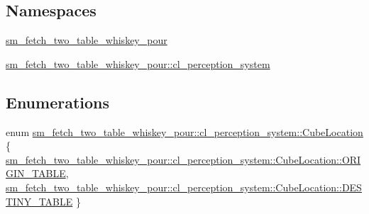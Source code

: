 \subsection*{Namespaces}
\begin{DoxyCompactItemize}
\item 
 \hyperlink{namespacesm__fetch__two__table__whiskey__pour}{sm\+\_\+fetch\+\_\+two\+\_\+table\+\_\+whiskey\+\_\+pour}
\item 
 \hyperlink{namespacesm__fetch__two__table__whiskey__pour_1_1cl__perception__system}{sm\+\_\+fetch\+\_\+two\+\_\+table\+\_\+whiskey\+\_\+pour\+::cl\+\_\+perception\+\_\+system}
\end{DoxyCompactItemize}
\subsection*{Enumerations}
\begin{DoxyCompactItemize}
\item 
enum \hyperlink{namespacesm__fetch__two__table__whiskey__pour_1_1cl__perception__system_a7523acd4abcc84c78d6a15965f9c25b9}{sm\+\_\+fetch\+\_\+two\+\_\+table\+\_\+whiskey\+\_\+pour\+::cl\+\_\+perception\+\_\+system\+::\+Cube\+Location} \{ \hyperlink{namespacesm__fetch__two__table__whiskey__pour_1_1cl__perception__system_a7523acd4abcc84c78d6a15965f9c25b9ae5ee34c3ef8ec4a46a00a218416c7b1d}{sm\+\_\+fetch\+\_\+two\+\_\+table\+\_\+whiskey\+\_\+pour\+::cl\+\_\+perception\+\_\+system\+::\+Cube\+Location\+::\+O\+R\+I\+G\+I\+N\+\_\+\+T\+A\+B\+LE}, 
\hyperlink{namespacesm__fetch__two__table__whiskey__pour_1_1cl__perception__system_a7523acd4abcc84c78d6a15965f9c25b9acdc3fdda18904b4a1ac0be036c86f973}{sm\+\_\+fetch\+\_\+two\+\_\+table\+\_\+whiskey\+\_\+pour\+::cl\+\_\+perception\+\_\+system\+::\+Cube\+Location\+::\+D\+E\+S\+T\+I\+N\+Y\+\_\+\+T\+A\+B\+LE}
 \}
\end{DoxyCompactItemize}
